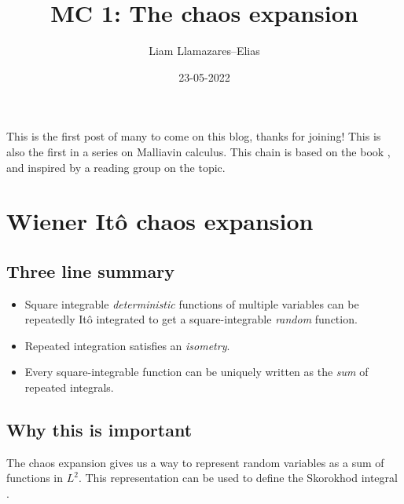 \documentclass[
    a4paper,
    DIV=14,
    abstract=true,
    numbers=noenddot
]{scrartcl}
\begin{document}
\title{MC 1: The chaos expansion}
\author{Liam Llamazares--Elias}
\date{23-05-2022}
\maketitle
This is the first post of many to come on this blog, thanks for joining! This is also the first in a series on Malliavin calculus. This chain is
based on the book \cite{nunno2008malliavin}, and inspired by a reading group on the topic.
\section{Wiener Itô chaos expansion}
\subsection{Three line summary}
\begin{itemize}
	\item Square integrable  \textit{deterministic} functions of multiple variables can be repeatedly Itô integrated to get a square-integrable \emph{random} function.
	\item  Repeated integration satisfies an \textit{isometry}.
	\item Every square-integrable function can be uniquely written as the \textit{sum} of repeated integrals.
\end{itemize}
\subsection{Why this is important}
The chaos expansion gives us a way to represent random variables as a sum of functions in $L^2$. This representation can be used to define the Skorokhod integral \cite{Skorokhodblog}.
\end{document}
